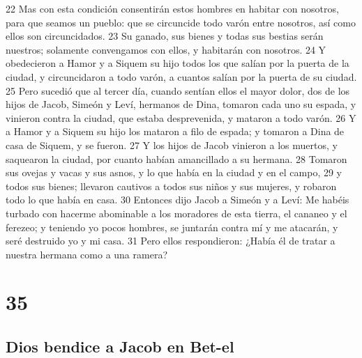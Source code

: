 22 Mas con esta condición consentirán estos hombres en habitar con nosotros, para que seamos un pueblo: que se circuncide todo varón entre nosotros, así como ellos son circuncidados.
23 Su ganado, sus bienes y todas sus bestias serán nuestros; solamente convengamos con ellos, y habitarán con nosotros.
24 Y obedecieron a Hamor y a Siquem su hijo todos los que salían por la puerta de la ciudad, y circuncidaron a todo varón, a cuantos salían por la puerta de su ciudad.
25 Pero sucedió que al tercer día, cuando sentían ellos el mayor dolor, dos de los hijos de Jacob, Simeón y Leví, hermanos de Dina, tomaron cada uno su espada, y vinieron contra la ciudad, que estaba desprevenida, y mataron a todo varón.
26 Y a Hamor y a Siquem su hijo los mataron a filo de espada; y tomaron a Dina de casa de Siquem, y se fueron.
27 Y los hijos de Jacob vinieron a los muertos, y saquearon la ciudad, por cuanto habían amancillado a su hermana.
28 Tomaron sus ovejas y vacas y sus asnos, y lo que había en la ciudad y en el campo,
29 y todos sus bienes; llevaron cautivos a todos sus niños y sus mujeres, y robaron todo lo que había en casa.
30 Entonces dijo Jacob a Simeón y a Leví: Me habéis turbado con hacerme abominable a los moradores de esta tierra, el cananeo y el ferezeo; y teniendo yo pocos hombres, se juntarán contra mí y me atacarán, y seré destruido yo y mi casa.
31 Pero ellos respondieron: ¿Había él de tratar a nuestra hermana como a una ramera?

\chapter{35}

\section*{Dios bendice a Jacob en Bet-el}

